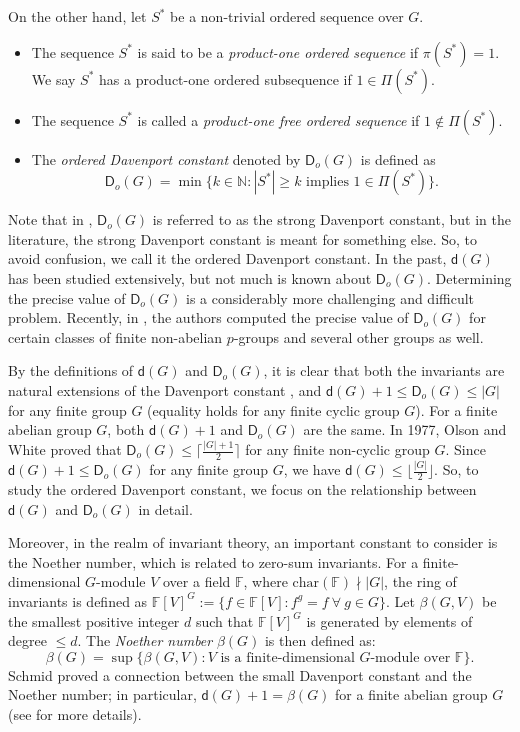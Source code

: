 \documentclass[a4paper,11pt]{article}
\numberwithin{equation}{section}
\newcommand{\no}{\noindent}
\begin{document}
On the other hand, let $S^{\ast}$ be a non-trivial ordered sequence over $G$. 
 \begin{itemize}
     \item The sequence $S^{\ast}$ is said to be a {\it product-one ordered sequence} if $\pi(S^{\ast})=1$. We say $S^{\ast}$ has a product-one ordered subsequence if $1 \in \Pi(S^{\ast})$. 
     \item The sequence $S^{\ast}$ is called a {\it product-one free ordered sequence} if $1\not\in \Pi(S^{\ast})$.
\item The {\it ordered Davenport constant} denoted by $\mathsf{D}_o(G)$ is 
defined as $$\mathsf{D}_o(G)=\min\big\{k \in \mathbb{N} : |S^{\ast}|\ge k \text{ implies } 1\in \Pi(S^{\ast}) \big\}.$$
\end{itemize}

\no Note that in \cite{Dimitrov}, $\mathsf{D}_o(G)$ is referred to as the strong Davenport constant, but in the literature, the strong Davenport constant \cite{chapman} is meant for something else. So, to avoid confusion, we call it the ordered Davenport constant. In the past, $\mathsf{d}(G)$ has been studied extensively, but not much is known about $\mathsf{D}_o(G)$. Determining the precise value of $\mathsf{D}_o(G)$ is a considerably more challenging and difficult problem. Recently, in \cite{NRE}, the authors computed the precise value of $\mathsf{D}_o(G)$ for certain classes of finite non-abelian $p$-groups and several other groups as well.

\no By the definitions of $\mathsf{d}(G)$ and $\mathsf{D}_o(G)$, it is clear that both the invariants are natural extensions of the Davenport constant \cite{Davenport}, and  $\mathsf{d}(G)+1 \le \mathsf{D}_o(G) \le |G|$ for any finite group $G$ (equality holds for any finite cyclic group $G$). For a finite abelian group $G$, both $\mathsf{d}(G)+1$ and $\mathsf{D}_o(G)$ are the same. In 1977, Olson and White \cite{OW} proved that $\mathsf{D}_{o}(G) \le \bigg\lceil \frac{|G|+1}{2} \bigg\rceil$ for any finite non-cyclic group $G$. Since $\mathsf{d}(G) +1 \le \mathsf{D}_o(G)$ for any finite group $G$, we have $\mathsf{d}(G) \le \big\lfloor \frac{|G|}{2}\big\rfloor$. So, to study the ordered Davenport constant, we focus on the relationship between $\mathsf{d}(G)$ and $\mathsf{D}_o(G)$ in detail.

\no Moreover, in the realm of invariant theory, an important constant to consider is the Noether number, which is related to zero-sum invariants. For a finite-dimensional $G$-module $V$ over a field $\mathbb{F}$, where $\text{char}(\mathbb{F}) \nmid |G|$, the ring of invariants is defined as $\mathbb{F}[V]^G:=\{f \in \mathbb{F}[V] : f^g=f ~\forall ~g \in G\}$.
Let $\beta(G, V)$ be the smallest positive integer $d$ such that $\mathbb{F}[V]^G$ is generated by elements of degree $\le d$. The \textit{Noether number} $\beta(G)$ is then defined as: 
$$\beta(G) = \sup{\{\beta(G,V) : V \text{ is a finite-dimensional } G \text{-module over } \mathbb{F}\}}.$$
\no Schmid \cite{Schmid} proved a connection between the small Davenport constant and the Noether number; in particular, $\mathsf{d}(G)+1 = \beta(G)$ for a finite abelian group $G$ (see \cite{CD2014} for more details).
\end{document}
